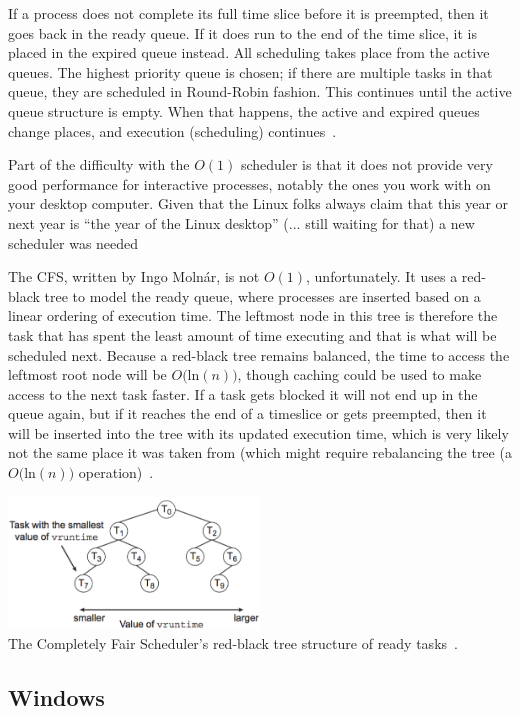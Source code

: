 If a process does not complete its full time slice before it is preempted, then it goes back in the ready queue. If it does run to the end of the time slice, it is placed in the expired queue instead. All scheduling takes place from the active queues. The highest priority queue is chosen; if there are multiple tasks in that queue, they are scheduled in Round-Robin fashion. This continues until the active queue structure is empty. When that happens, the active and expired queues change places, and execution (scheduling) continues~\cite{osi}.

Part of the difficulty with the $O(1)$ scheduler is that it does not provide very good performance for interactive processes, notably the ones you work with on your desktop computer. Given that the Linux folks always claim that this year or next year is ``the year of the Linux desktop'' (... still waiting for that) a new scheduler was needed

The CFS, written by Ingo Moln\'ar, is not $O(1)$, unfortunately. It uses a red-black tree to model the ready queue, where processes are inserted based on a linear ordering of execution time. The leftmost node in this tree is therefore the task that has spent the least amount of time executing and that is what will be scheduled next. Because a red-black tree remains balanced, the time to access the leftmost root node will be $O($ln$(n))$, though caching could be used to make access to the next task faster. If a task gets blocked it will not end up in the queue again, but if it reaches the end of a timeslice or gets preempted, then it will be inserted into the tree with its updated execution time, which is very likely not the same place it was taken from (which might require rebalancing the tree (a $O($ln$(n))$ operation)~\cite{mte241}.

\begin{center}
	\includegraphics[width=0.5\textwidth]{images/cfs.png}\\
	The Completely Fair Scheduler's red-black tree structure of ready tasks~\cite{osc}.
\end{center}




\subsection*{Windows}



